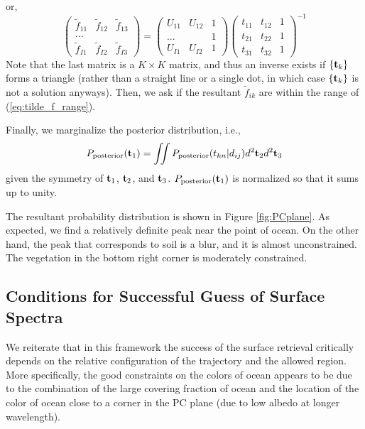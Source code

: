 \documentclass[iop,numberedappendix,apj]{emulateapj}
\def\fast{\tilde f}
\begin{document}
or,
\begin{equation}
\begin{pmatrix}
\fast_{11} & \fast_{12} & \fast_{13}  \\
... & \\
\fast_{I1} & \fast_{I2} & \fast_{I3}
\end{pmatrix}
=
\begin{pmatrix}
U_{11} & U_{12} & 1 \\
... & & 1 \\
U_{I1} & U_{I2} & 1 
\end{pmatrix}
\begin{pmatrix}
t_{11} & t_{12} & 1 \\
t_{21} & t_{22} & 1 \\
t_{31} & t_{32} & 1 
\end{pmatrix}^{-1}
\label{eq:f=ds-1}
\end{equation}
Note that the last matrix is a $K\times K$ matrix, and thus an inverse exists if $\{ {\bf t}_k \}$ forms a triangle (rather than a straight line or a single dot, in which case $\{ {\bf t}_k \}$ is not a solution anyways).
Then, we ask if the resultant $\fast_{ik}$ are within the range of (\ref{eq:tilde_f_range}). 

Finally, we marginalize the posterior distribution, i.e.,
\begin{equation} 
P_{\rm posterior} ( {\bf t}_1) = \iint P_{\rm posterior} ( t_{kn} | d_{ij} ) d^2 {\bf t}_2 d^2 {\bf t}_3
\end{equation}
given the symmetry of ${\bf t}_1$, ${\bf t}_2$, and ${\bf t}_3$. 
$P_{\rm posterior} ( {\bf t}_1) $ is normalized so that it sums up to unity. 

The resultant probability distribution is shown in Figure \ref{fig:PCplane}. 
As expected, we find a relatively definite peak near the point of ocean. 
On the other hand, the peak that corresponds to soil is a blur, and it is almost unconstrained. 
The vegetation in the bottom right corner is moderately constrained. 


\subsection{Conditions for Successful Guess of Surface Spectra}
\label{ss:guess}


We reiterate that in this framework the success of the surface retrieval critically depends on the relative configuration of the trajectory and the allowed region. 
More specifically, the good constraints on the colors of ocean appears to be due to the combination of the large covering fraction of ocean and the location of the color of ocean close to a corner in the PC plane (due to low albedo at longer wavelength). 
\end{document}
